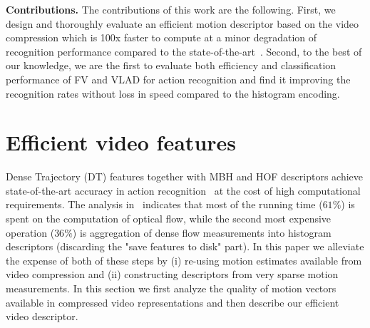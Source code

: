 \documentclass[10pt,twocolumn,letterpaper]{article}
\begin{document}
\noindent\textbf{Contributions.} The contributions of this work are the following. First, we design and thoroughly evaluate an efficient motion descriptor based on the video compression which is 100x faster to compute at a minor degradation of recognition performance compared to the state-of-the-art~\cite{Wang12}. Second, to the best of our knowledge, we are the first to evaluate both efficiency and classification performance of FV and VLAD for action recognition and find it improving the recognition rates without loss in speed compared to the histogram encoding.

\section{Efficient video features}
\label{sec:features}

Dense Trajectory (DT) features together with MBH and HOF descriptors achieve state-of-the-art accuracy in action recognition~\cite{Wang12} at the cost of high computational requirements.
The analysis in~\cite{Wang12} indicates that most of the running time ($61\%$) is spent on the computation of optical flow, while the second most expensive operation ($36\%$) is aggregation of dense flow measurements into histogram descriptors (discarding the "save features to disk" part). In this paper we alleviate the expense of both of these steps by (i) re-using motion estimates available from video compression and (ii) constructing descriptors from very sparse motion measurements. %
In this section we first analyze the quality of motion vectors available in compressed video representations and then describe our efficient video descriptor.

\end{document}
